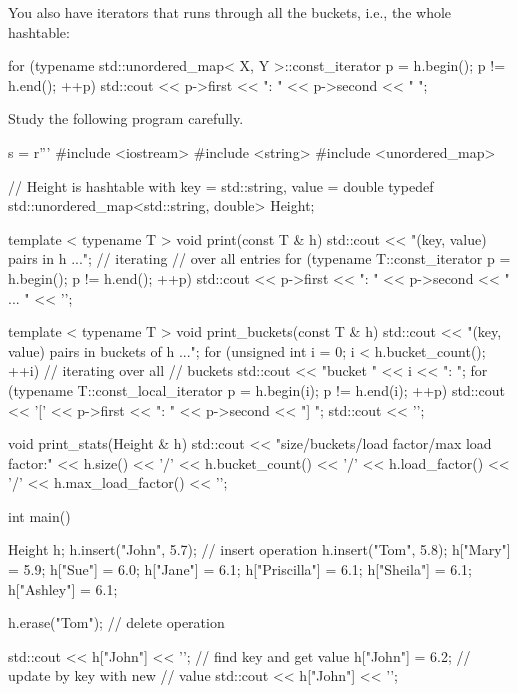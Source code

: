You also have iterators that runs through all the buckets, i.e., the whole hashtable:
\begin{console}[fontsize=\footnotesize]
for (typename std::unordered_map< X, Y >::const_iterator p = h.begin();
     p != h.end(); ++p)
{
    std::cout << p->first << ": " << p->second << "  ";
}
\end{console}

Study the following program carefully.

\begin{python}
s = r'''
#include <iostream>
#include <string>
#include <unordered_map>

// Height is hashtable with key = std::string, value = double
typedef std::unordered_map<std::string, double> Height;

template < typename T >
void print(const T & h)
{
    std::cout << "(key, value) pairs in h ...\n"; // iterating
                                     // over all entries
    for (typename T::const_iterator p = h.begin();
         p != h.end(); ++p)
    {
        std::cout << p->first << ": " << p->second
                  << " ... "
                  << '\n';
    }
}

template < typename T >
void print_buckets(const T & h)
{
    std::cout << "(key, value) pairs in buckets of h ..."; 
    for (unsigned int i = 0; i < h.bucket_count(); ++i)
                                     // iterating over all
                                     // buckets
    {
        std::cout << "bucket " << i << ": ";
        for (typename T::const_local_iterator p = h.begin(i);
             p != h.end(i); ++p)
        {
            std::cout << '['
                      << p->first << ": " << p->second
                      << "] ";
        }
        std::cout << '\n';
    }
}
  
void print_stats(Height & h)
{
    std::cout << "size/buckets/load factor/max load factor:"
              << h.size() << '/'
              << h.bucket_count() << '/'
              << h.load_factor() << '/'
              << h.max_load_factor() << '\n';
}

int main()
{
    Height h;
    h.insert({"John", 5.7});         // insert operation
    h.insert({"Tom", 5.8});
    h["Mary"] = 5.9;
    h["Sue"] = 6.0;
    h["Jane"] = 6.1;
    h["Priscilla"] = 6.1;
    h["Sheila"] = 6.1;
    h["Ashley"] = 6.1;
    
    h.erase("Tom");                  // delete operation
    
    std::cout << h["John"] << '\n';  // find key and get value
    h["John"] = 6.2;                 // update by key with new
                                     // value
    std::cout << h["John"] << '\n';
    
}
\end{python}
